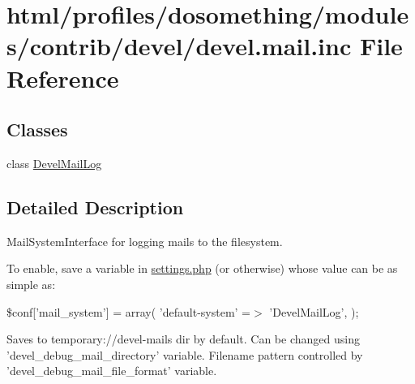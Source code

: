 \hypertarget{devel_8mail_8inc}{
\section{html/profiles/dosomething/modules/contrib/devel/devel.mail.inc File Reference}
\label{devel_8mail_8inc}
}
\subsection*{Classes}
\begin{DoxyCompactItemize}
\item 
class \hyperlink{classDevelMailLog}{DevelMailLog}
\end{DoxyCompactItemize}


\subsection{Detailed Description}
MailSystemInterface for logging mails to the filesystem.

To enable, save a variable in \hyperlink{settings_8php}{settings.php} (or otherwise) whose value can be as simple as:

\$conf\mbox{[}'mail\_\-system'\mbox{]} = array( 'default-\/system' =$>$ 'DevelMailLog', );

Saves to temporary://devel-\/mails dir by default. Can be changed using 'devel\_\-debug\_\-mail\_\-directory' variable. Filename pattern controlled by 'devel\_\-debug\_\-mail\_\-file\_\-format' variable. 